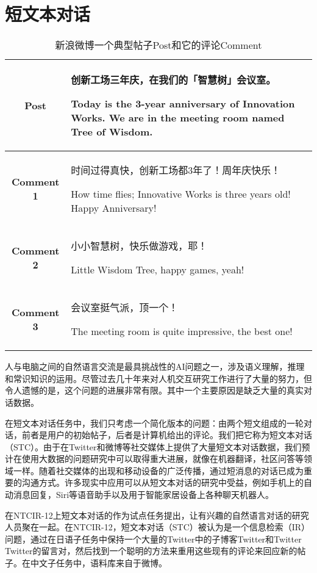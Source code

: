\chapter{短文本对话}

\begin{table}[htbp]
\centering
\caption{新浪微博一个典型帖子Post和它的评论Comment} \label{tab:example_STC}
\begin{tabular}{|c|p{10cm}|}
    \hline
    \textbf{Post} & 创新工场三年庆，在我们的「智慧树」会议室。\par Today is the 3-year anniversary of Innovation Works. We are in the meeting room named Tree of Wisdom.  \\
    \hline
    \textbf{Comment 1} & 时间过得真快，创新工场都3年了！周年庆快乐！\par How time flies; Innovative Works is three years old! Happy Anniversary!\\
    \hline
	\textbf{Comment 2} & 小小智慧树，快乐做游戏，耶！\par Little Wisdom Tree, happy games, yeah! \\
	\hline
	\textbf{Comment 3} & 会议室挺气派，顶一个！\par The meeting room is quite impressive, the best one! \\
	\hline
\end{tabular}
\end{table}
人与电脑之间的自然语言交流是最具挑战性的AI问题之一，涉及语义理解，推理和常识知识的运用。尽管过去几十年来对人机交互研究工作进行了大量的努力，但令人遗憾的是，这个问题的进展非常有限。其中一个主要原因是缺乏大量的真实对话数据。

在短文本对话任务中，我们只考虑一个简化版本的问题：由两个短文组成的一轮对话，前者是用户的初始帖子，后者是计算机给出的评论。我们把它称为短文本对话（STC）。由于在Twitter和微博等社交媒体上提供了大量短文本对话数据，我们预计在使用大数据的问题研究中可以取得重大进展，就像在机器翻译，社区问答等领域一样。随着社交媒体的出现和移动设备的广泛传播，通过短消息的对话已成为重要的沟通方式。许多现实中应用可以从短文本对话的研究中受益，例如手机上的自动消息回复，Siri等语音助手以及用于智能家居设备上各种聊天机器人。

在NTCIR-12上短文本对话的作为试点任务提出，让有兴趣的自然语言对话的研究人员聚在一起。在NTCIR-12，短文本对话（STC）被认为是一个信息检索（IR）问题，通过在日语子任务中保持一个大量的Twitter中的子博客Twitter和Twitter Twitter的留言对，然后找到一个聪明的方法来重用这些现有的评论来回应新的帖子。在中文子任务中，语料库来自于微博。

